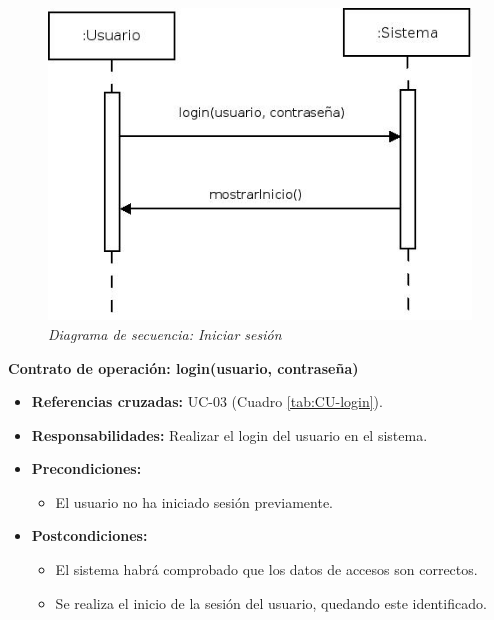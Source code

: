 \begin{figure}[H]
\centering
  \includegraphics[scale=.55]{img/secuencias/gestion-usuarios-login.jpeg}
  \caption{\textit{Diagrama de secuencia: Iniciar sesión}}
  \label{fig:secuencia-gestion-usuarios-login}
\end{figure}


\textbf{Contrato de operación: login(usuario, contraseña)}
\begin{itemize}
\item \textbf{Referencias cruzadas:} UC-03 (Cuadro \ref{tab:CU-login}).
\item \textbf{Responsabilidades:} Realizar el login del usuario en el sistema.
\item \textbf{Precondiciones:} 
 \begin{itemize}
\item El usuario no ha iniciado sesión previamente.
\end {itemize}
\item \textbf{Postcondiciones:} 
 \begin{itemize}
\item El sistema habrá comprobado que los datos de accesos son correctos.
\item Se realiza el inicio de la sesión del usuario, quedando este identificado.
\end {itemize}
\end {itemize}

